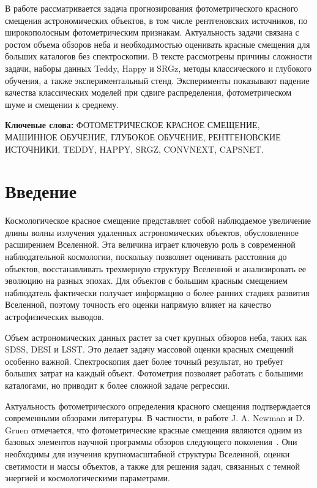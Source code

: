 \documentclass[12pt,a4paper]{article}
\begin{document}
В работе рассматривается задача прогнозирования фотометрического красного смещения астрономических объектов, в том числе рентгеновских источников, по широкополосным фотометрическим признакам. Актуальность задачи связана с ростом объема обзоров неба и необходимостью оценивать красные смещения для больших каталогов без спектроскопии. В тексте рассмотрены причины сложности задачи, наборы данных Teddy, Happy и SRGz, методы классического и глубокого обучения, а также экспериментальный стенд. Эксперименты показывают падение качества классических моделей при сдвиге распределения, фотометрическом шуме и смещении к среднему.

\textbf{Ключевые слова:} ФОТОМЕТРИЧЕСКОЕ КРАСНОЕ СМЕЩЕНИЕ, МАШИННОЕ ОБУЧЕНИЕ, ГЛУБОКОЕ ОБУЧЕНИЕ, РЕНТГЕНОВСКИЕ ИСТОЧНИКИ, TEDDY, HAPPY, SRGZ, CONVNEXT, CAPSNET.

\newpage
\tableofcontents
\newpage

\section*{Введение}

Космологическое красное смещение представляет собой наблюдаемое увеличение длины волны излучения удаленных астрономических объектов, обусловленное расширением Вселенной. Эта величина играет ключевую роль в современной наблюдательной космологии, поскольку позволяет оценивать расстояния до объектов, восстанавливать трехмерную структуру Вселенной и анализировать ее эволюцию на разных эпохах. Для объектов с большим красным смещением наблюдатель фактически получает информацию о более ранних стадиях развития Вселенной, поэтому точность его оценки напрямую влияет на качество астрофизических выводов.

Объем астрономических данных растет за счет крупных обзоров неба, таких как SDSS, DESI и LSST. Это делает задачу массовой оценки красных смещений особенно важной. Спектроскопия дает более точный результат, но требует больших затрат на каждый объект. Фотометрия позволяет работать с большими каталогами, но приводит к более сложной задаче регрессии.

Актуальность фотометрического определения красного смещения подтверждается современными обзорами литературы. В частности, в работе J. A. Newman и D. Gruen отмечается, что фотометрические красные смещения являются одним из базовых элементов научной программы обзоров следующего поколения~\cite{newman2022}. Они необходимы для изучения крупномасштабной структуры Вселенной, оценки светимости и массы объектов, а также для решения задач, связанных с темной энергией и космологическими параметрами.
\end{document}
